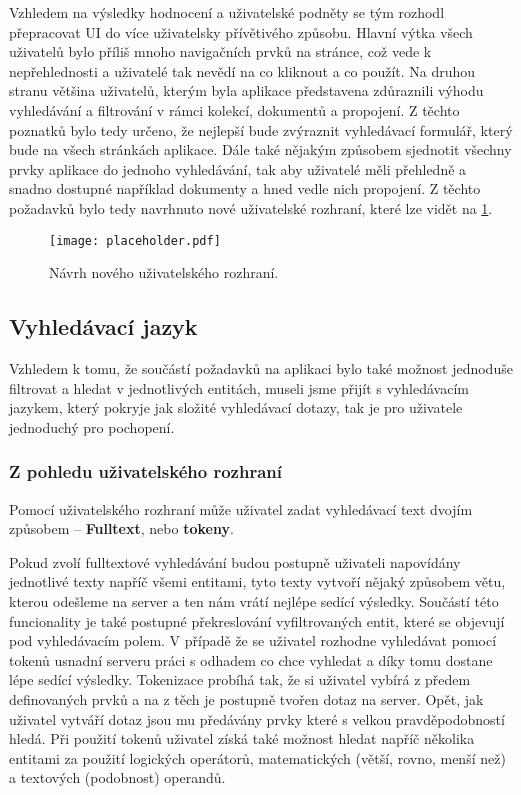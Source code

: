 \par Vzhledem na výsledky hodnocení a uživatelské podněty se tým rozhodl přepracovat UI do více uživatelsky přívětivého způsobu. Hlavní výtka všech uživatelů bylo příliš mnoho navigačních prvků na stránce, což vede k nepřehlednosti a uživatelé tak nevědí na co kliknout a co použít. Na druhou stranu většina uživatelů, kterým byla aplikace představena zdůraznili výhodu vyhledávání a filtrování v rámci kolekcí, dokumentů a propojení. Z těchto poznatků bylo tedy určeno, že nejlepší bude zvýraznit vyhledávací formulář, který bude na všech stránkách aplikace. Dále také nějakým způsobem sjednotit všechny prvky aplikace do jednoho vyhledávání, tak aby uživatelé měli přehledně a snadno dostupné například dokumenty a hned vedle nich propojení. Z těchto požadavků bylo tedy navrhnuto nové uživatelské rozhraní, které lze vidět na \ref{new-ui}.

\begin{figure}[htp]
  \centering
  \texttt{[image: placeholder.pdf]}
  \caption{Návrh nového uživatelského rozhraní.}
  \label{new-ui}
\end{figure}

\subsection{Vyhledávací jazyk}
\par Vzhledem k tomu, že součástí požadavků na aplikaci bylo také možnost jednoduše filtrovat a hledat v jednotlivých entitách, museli jsme přijít s vyhledávacím jazykem, který pokryje jak složité vyhledávací dotazy, tak je pro uživatele jednoduchý pro pochopení.

\subsubsection{Z pohledu uživatelského rozhraní}
\par Pomocí uživatelského rozhraní může uživatel zadat vyhledávací text dvojím způsobem -- \textbf{Fulltext}, nebo \textbf{tokeny}.

\par Pokud zvolí fulltextové vyhledávání  budou postupně uživateli napovídány jednotlivé texty napříč všemi entitami, tyto texty vytvoří nějaký způsobem větu, kterou odešleme na server a ten nám vrátí nejlépe sedící výsledky. Součástí této funcionality je také postupné překreslování vyfiltrovaných entit, které se objevují pod vyhledávacím polem. V případě že se uživatel rozhodne vyhledávat pomocí tokenů usnadní serveru práci s odhadem co chce vyhledat a díky tomu dostane lépe sedící výsledky. Tokenizace probíhá tak, že si uživatel vybírá z předem definovaných prvků a na z těch je postupně tvořen dotaz na server. Opět, jak uživatel vytváří dotaz jsou mu předávány prvky které s velkou pravděpodobností hledá. Při použití tokenů uživatel získá také možnost hledat napříč několika entitami za použití logických operátorů, matematických (větší, rovno, menší než) a textových (podobnost) operandů.

